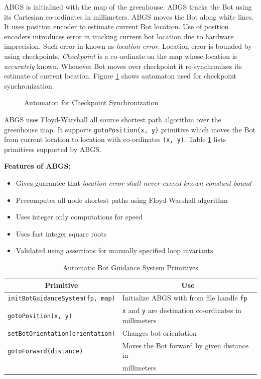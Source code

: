 \documentclass[a4paper, 12pt]{article}
\begin{document}
ABGS is initialized with the map of the greenhouse. ABGS tracks the Bot using its Cartesian co-ordinates in millimeters.
ABGS moves the Bot along white lines. It uses position encoder to estimate current Bot location. Use of position
encoders introduces error in tracking current bot location due to hardware imprecision. Such error in known as 
\emph{location error}. Location error is bounded by using checkpoints. \emph{Checkpoint} is a co-ordinate on 
the map whose location is \emph{accurately} known. Whenever Bot moves over checkpoint it re-synchronizes its
estimate of current location. Figure \ref{fig-automata} shows automaton used for checkpoint synchronization.
\begin{figure}
 
 \caption{Automaton for Checkpoint Synchronization}
 \label{fig-automata}
\end{figure}


ABGS uses Floyd-Warshall all source shortest path algorithm over the greenhouse map. It supports 
\texttt{gotoPosition(x, y)} primitive which moves the Bot from current location to location with co-ordinates
\texttt{(x, y)}. Table \ref{table-abgs-primitives} lists primitives supported by ABGS.

\vspace{\baselineskip}
\textbf{Features of ABGS:}
\begin{itemize}
 \item Gives guarantee that \emph{location error shall never exceed known constant bound}
 \item Precomputes all node shortest paths using Floyd-Warshall algorithm
 \item Uses integer only computations for speed
 \item Uses fast integer square roots
 \item Validated using assertions for manually specified loop invariants
\end{itemize}

\begin{table}
 \centering
 \begin{tabular}{|l|l|}
 \hline
 \multicolumn{1}{|c|}{\textbf{Primitive}} & \multicolumn{1}{|c|}{\textbf{Use}}\\
 \hline \hline
 \texttt{initBotGuidanceSystem(fp, map)} & Initialize ABGS with from file handle \texttt{fp}\\
 \texttt{gotoPosition(x, y)} & \texttt{x} and \texttt{y} are destination co-ordinates in millimeters\\
 \texttt{setBotOrientation(orientation)} & Changes bot orientation\\
 \texttt{gotoForward(distance)} & Moves the Bot forward by given distance in\\
  & millimeters\\
 \hline
 \end{tabular}
 \caption{Automatic Bot Guidance System Primitives}
 \label{table-abgs-primitives}
\end{table}
\end{document}
